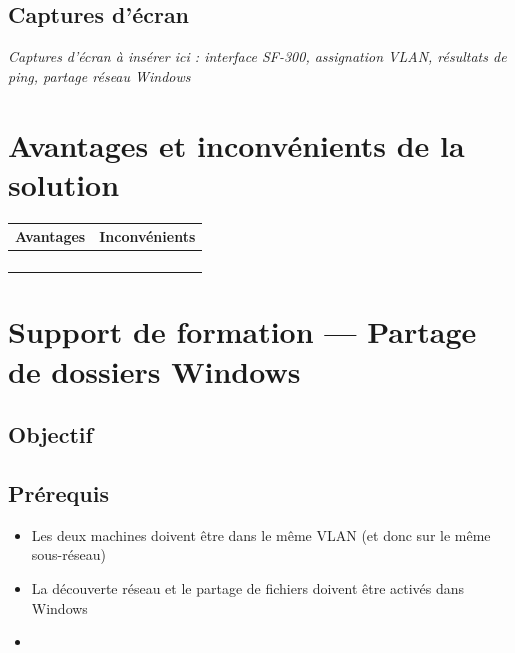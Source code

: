 \documentclass[a4paper,12pt]{article}
\begin{document}
\subsection{Captures d'écran}

\begin{infobox}
  \textit{Captures d'écran à insérer ici : interface SF-300, assignation VLAN, résultats de ping, partage réseau Windows}
\end{infobox}

\section{Avantages et inconvénients de la solution}

\begin{tabularx}{\textwidth}{X X}
  \toprule
  \textbf{Avantages} & \textbf{Inconvénients} \\
  \midrule
  & \\
  & \\
  & \\
  & \\
  \bottomrule
\end{tabularx}

\section{Support de formation — Partage de dossiers Windows}

\subsection{Objectif}


\subsection{Prérequis}

\begin{itemize}
  \item Les deux machines doivent être dans le même VLAN (et donc sur le même sous-réseau)
  \item La découverte réseau et le partage de fichiers doivent être activés dans Windows
  \item
\end{itemize}
\end{document}
